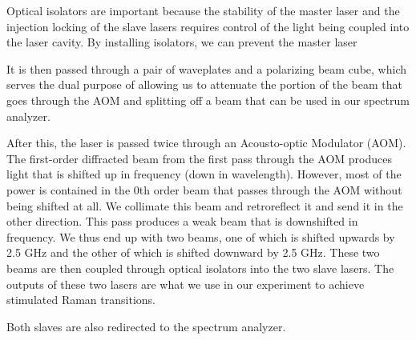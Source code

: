 Optical isolators are important because the stability of the master laser and the injection locking of the slave lasers requires control of the light being coupled into the laser cavity. By installing isolators, we can prevent the master laser


It is then passed through a pair of waveplates and a polarizing beam cube, which serves the dual purpose of allowing us to attenuate the portion of the beam that goes through the AOM and splitting off a beam that can be used in our spectrum analyzer. 

After this, the laser is passed twice through an Acousto-optic Modulator (AOM). The first-order diffracted beam from the first pass through the AOM produces light that is shifted up in frequency (down in wavelength). However, most of the power is contained in the 0th order beam that passes through the AOM without being shifted at all. We collimate this beam and retroreflect it and send it in the other direction. This pass produces a weak beam that is downshifted in frequency. We thus end up with two beams, one of which is shifted upwards by 2.5 GHz and the other of which is shifted downward by 2.5 GHz. These two beams are then coupled through optical isolators into the two slave lasers. The outputs of these two lasers are what we use in our experiment to achieve stimulated Raman transitions. 


Both slaves are also redirected to the spectrum analyzer. 
